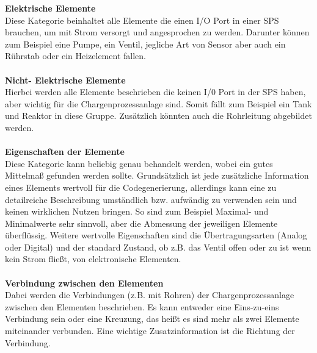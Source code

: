 \textbf{Elektrische Elemente}\\
Diese Kategorie beinhaltet alle Elemente die einen I/O Port in einer SPS brauchen, um mit Strom versorgt und angesprochen zu werden. Darunter können zum Beispiel eine Pumpe, ein Ventil, jegliche Art von Sensor aber auch ein Rührstab oder ein Heizelement fallen. \\\\
\textbf{Nicht- Elektrische Elemente}\\
Hierbei werden alle Elemente beschrieben die keinen I/0 Port in der SPS haben, aber wichtig für die Chargenprozessanlage sind. Somit fällt zum Beispiel ein Tank und Reaktor in diese Gruppe. Zusätzlich könnten auch die Rohrleitung abgebildet werden.\\\\
\textbf{Eigenschaften der Elemente}  \\
Diese Kategorie kann beliebig genau behandelt werden, wobei ein gutes Mittelmaß gefunden werden sollte. Grundsätzlich ist jede zusätzliche Information eines Elements wertvoll für die Codegenerierung, allerdings kann eine zu detailreiche Beschreibung umständlich bzw. aufwändig zu verwenden sein und keinen wirklichen Nutzen bringen.
So sind zum Beispiel Maximal- und Minimalwerte sehr sinnvoll, aber die Abmessung der jeweiligen Elemente überflüssig. Weitere wertvolle Eigenschaften sind die Übertragungsarten (Analog oder Digital) und der standard Zustand, ob z.B. das Ventil offen oder zu ist wenn kein Strom fließt, von elektronische Elementen.   \\\\
\textbf{Verbindung zwischen den Elementen}  \\
Dabei werden die Verbindungen (z.B. mit Rohren) der Chargenprozessanlage zwischen den Elementen beschrieben. 
Es kann entweder eine Eins-zu-eins Verbindung sein oder eine Kreuzung, das heißt es sind mehr als zwei Elemente miteinander verbunden. Eine wichtige Zusatzinformation ist die Richtung der Verbindung.



